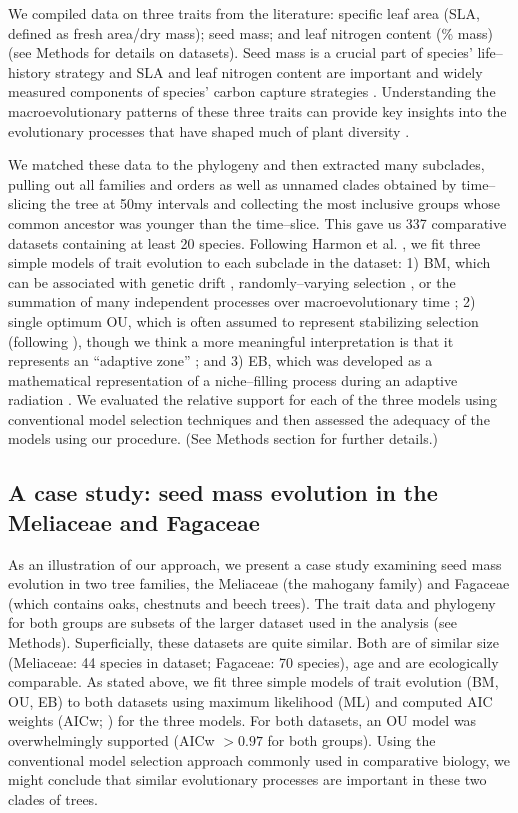 \documentclass[a4paper,12pt]{article}
\begin{document}
We compiled data on three traits from the literature: specific leaf area (SLA, defined as fresh area/dry mass); seed mass; and leaf nitrogen content (\% mass) (see Methods for details on datasets). Seed mass is a crucial part of species' life--history strategy \citep{Leishman2000, Westoby2002} and SLA and leaf nitrogen content are important and widely measured components of species' carbon capture strategies \citep{Wright2004}. Understanding the macroevolutionary patterns of these three traits can provide key insights into the evolutionary processes that have shaped much of plant diversity \citep{ksi}.  

We matched these data to the phylogeny and then extracted many subclades, pulling out all families and orders as well as unnamed clades obtained by time--slicing the tree at 50my intervals and collecting the most inclusive groups whose common ancestor was younger than the time--slice. This gave us 337 comparative datasets containing at least 20 species.
Following Harmon et al. \citep{Harmon2010}, we fit three simple models of trait evolution to each subclade in the dataset: 1) BM, which can be associated with genetic drift \citep{Lande1976, Felsenstein1988, Lynch1990, HansenMartins1996}, randomly--varying selection \citep{Felsenstein1973}, or the summation of many independent processes over macroevolutionary time \citep{HansenMartins1996, Uyeda2011, PennellPE}; 2) single optimum OU, which is often assumed to represent stabilizing selection (following \citep{Lande1976}), though we think a more meaningful interpretation is that it represents an ``adaptive zone'' \citep{Hansen2012book, PennellHarmon}; and 3) EB, which was developed as a mathematical representation of a niche--filling process during an adaptive radiation \citep{Blomberg2003, Harmon2010, SlaterPennell}. We evaluated the relative support for each of the three models using conventional model selection techniques and then assessed the adequacy of the models using our procedure. (See Methods section for further details.) 


\subsection{A case study: seed mass evolution in the Meliaceae and Fagaceae }
As an illustration of our approach, we present a case study examining seed mass evolution in two tree families, the Meliaceae (the mahogany family) and Fagaceae (which contains oaks, chestnuts and beech trees). The trait data and phylogeny for both groups are subsets of the larger dataset used in the analysis (see Methods). Superficially, these datasets are quite similar. Both are of similar size (Meliaceae: 44 species in dataset; Fagaceae: 70 species), age and are ecologically comparable. As stated above, we fit three simple models of trait evolution (BM, OU, EB) to both datasets using maximum likelihood (ML) and computed AIC weights (AICw; \citep{Akaike1974, aicweight}) for the three models. For both datasets, an OU model was overwhelmingly supported (AICw $>0.97$ for both groups). Using the conventional model selection approach commonly used in comparative biology, we might conclude that similar evolutionary processes are important in these two clades of trees.
\end{document}
